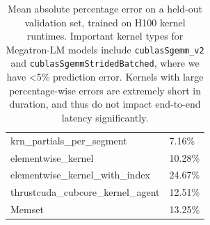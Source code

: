 \begin{table}[htbp]
\begin{tabular}{l l}
krn\_partials\_per\_segment & 7.16\% \\
elementwise\_kernel & 10.28\% \\
elementwise\_kernel\_with\_index & 24.67\% \\
thrustcuda\_cubcore\_kernel\_agent & 12.51\% \\
Memset & 13.25\% \\
\bottomrule
\end{tabular}
\caption{Mean absolute percentage error on a held-out validation set, trained on H100 kernel runtimes. Important kernel types for Megatron-LM models include \texttt{cublasSgemm\_v2} and \texttt{cublasSgemmStridedBatched}, where we have <5\% prediction error. Kernels with large percentage-wise errors are extremely short in duration, and thus do not impact end-to-end latency significantly.}
\label{tab:h100_kernel_accuracy}
\end{table}
